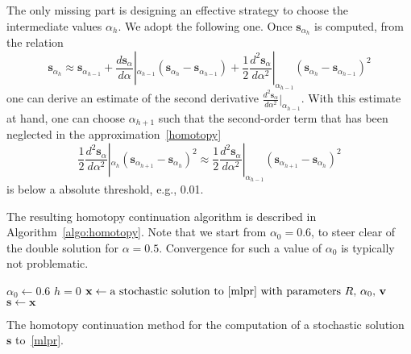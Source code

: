 \documentclass[10pt]{paper}
\DeclarePairedDelimiter{\norm}{\lVert}{\rVert}
\begin{document}
The only missing part is designing an effective strategy to choose the intermediate values $\alpha_h$. We adopt the following one. Once ${\mathbf{s}}_{\alpha_h}$ is computed, from the relation
\[
	{\mathbf{s}}_{\alpha_h} \approx {\mathbf{s}}_{\alpha_{h-1}} + \frac{d {\mathbf{s}}_{\alpha}}{d\alpha}|_{\alpha_{h-1}} ({\mathbf{s}}_{\alpha_h}-{\mathbf{s}}_{\alpha_{h-1}}) + \frac12 \frac{d^2 {\mathbf{s}}_{\alpha}}{d\alpha^2}|_{\alpha_{h-1}} ({\mathbf{s}}_{\alpha_h}-{\mathbf{s}}_{\alpha_{h-1}})^2  
\]
one can derive an estimate of the second derivative $\frac{d^2 {\mathbf{s}}_{\alpha}}{d\alpha^2}|_{\alpha_{h-1}}$. With this estimate at hand, one can choose $\alpha_{h+1}$ such that the second-order term that has been neglected in the approximation~\eqref{homotopy}
\[
	\frac12 \frac{d^2 {\mathbf{s}}_{\alpha}}{d\alpha^2}|_{\alpha_{h}} ({\mathbf{s}}_{\alpha_{h+1}}-{\mathbf{s}}_{\alpha_h})^2 \approx \frac12 \frac{d^2 {\mathbf{s}}_{\alpha}}{d\alpha^2}|_{\alpha_{h-1}} ({\mathbf{s}}_{\alpha_{h+1}}-{\mathbf{s}}_{\alpha_h})^2
\]
is below a absolute threshold, e.g., 0.01.

The resulting homotopy continuation algorithm is described in Algorithm~\ref{algo:homotopy}. Note that we start from $\alpha_0 = 0.6$, to steer clear of the double solution for $\alpha=0.5$. Convergence for such a value of $\alpha_0$ is typically not problematic.
\begin{algorithm}
$\alpha_0 \leftarrow 0.6$\;
$h = 0$\;
${\mathbf{x}} \leftarrow \text{a stochastic solution to~\eqref{mlpr} with parameters $R$, $\alpha_0$, ${\mathbf{v}}$}$\;
${\mathbf{s}} \leftarrow {\mathbf{x}}$\;

\caption{The homotopy continuation method for the computation of a stochastic solution ${\mathbf{s}}$ to~\eqref{mlpr}.} \label{algo:homotopy}
\end{algorithm}
\end{document}

